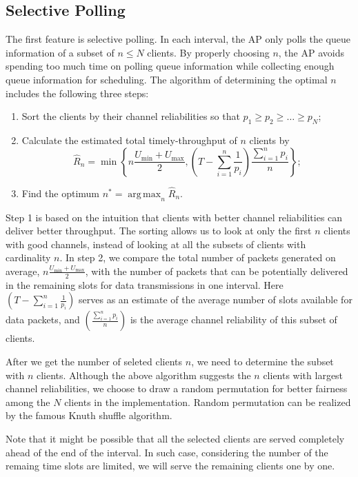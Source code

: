 \documentclass{article}
\DeclareMathOperator*{\argmax}{arg\,max}
\begin{document}
\subsection{Selective Polling}
The first feature is selective polling. In each interval, the AP only polls the queue information of a subset of $n \le N $ clients. By properly choosing $n$, the AP avoids spending too much time on polling queue information while collecting enough queue information for scheduling. The algorithm of determining the optimal $n$ includes the following three steps:
\begin{enumerate}
\item Sort the clients by their channel reliabilities so that $p_1 \geq p_2 \geq \dots \geq p_N$;
\item Calculate the estimated total timely-throughput of $n$ clients by
   \[
   \hat{R}_n = \min\left\{n\frac{U_{\min}+U_{\max}}{2}, \left(T-\sum_{i=1}^{n}\frac{1}{p_i}\right)\frac{\sum_{i=1}^{n}p_i}{n} \right\};
   \]
\item Find the optimum $n^* = \argmax_{n} \hat{R}_n$.
\end{enumerate}
Step 1 is based on the intuition that clients with better channel reliabilities can deliver better throughput. The sorting allows us to look at only the first $n$ clients with good channels, instead of looking at all the subsets of clients with cardinality $n$. In step 2, we compare the total number of packets generated on average, $n\frac{U_{\min}+U_{\max}}{2}$, with the number of packets that can be potentially delivered in the remaining slots for data transmissions in one interval. Here $\left(T-\sum_{i=1}^{n}\frac{1}{p_i}\right)$ serves as an estimate of the average number of slots available for data packets, and $\left(\frac{\sum_{i=1}^{n}p_i}{n}\right)$ is the average channel reliability of this subset of clients.

After we get the number of seleted clients $n$, we need to determine the subset with $n$ clients. Although the above algorithm suggests the $n$ clients with largest channel reliabilities, we choose to draw a random permutation for better fairness among the $N$ clients in the implementation.
Random permutation can be realized by the famous Knuth shuffle algorithm.

Note that it might be possible that all the selected clients are served completely ahead of the end of the interval. In such case, considering the number of the remaing time slots are limited, we will serve the remaining clients one by one.
\end{document}
